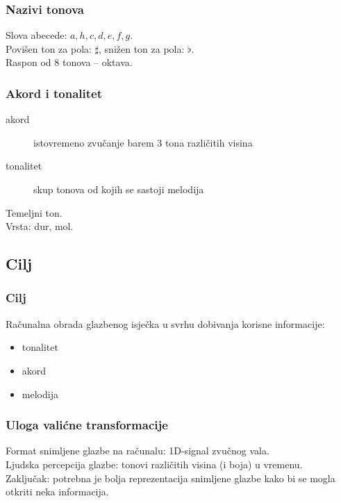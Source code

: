 \documentclass[11pt]{beamer}
\begin{document}
  \begin{frame}
    \frametitle{Nazivi tonova}
    Slova abecede: $a, h, c, d, e, f, g$.\\
    \vspace{10pt}
    Povišen ton za pola: $\sharp$, snižen ton za pola: $\flat$.\\
    \vspace{10pt}
    Raspon od 8 tonova -- oktava.    
  \end{frame}

  \begin{frame}
    \frametitle{Akord i tonalitet}
    \begin{description}
      \item[akord] istovremeno zvučanje barem 3 tona različitih visina
      \item[tonalitet] skup tonova od kojih se sastoji melodija
    \end{description}
  
    Temeljni ton.\\
    \vspace{10pt}
    Vrsta: dur, mol.
  \end{frame}

  \subsection{Cilj}
  \begin{frame}
    \frametitle{Cilj}
    Računalna obrada glazbenog isječka u svrhu dobivanja korisne informacije:
    \begin{itemize}
      \item tonalitet
      \item akord
      \item melodija
    \end{itemize}
  \end{frame}

  \begin{frame}
    \frametitle{Uloga valićne transformacije}
    Format snimljene glazbe na računalu: 1D-signal zvučnog vala.\\
    \vspace{10pt}
    Ljudska percepcija glazbe: tonovi različitih visina (i boja) u vremenu.\\
    \vspace{10pt}
    Zaključak: potrebna je bolja reprezentacija snimljene glazbe kako bi se mogla otkriti neka informacija.
  \end{frame}
\end{document}
